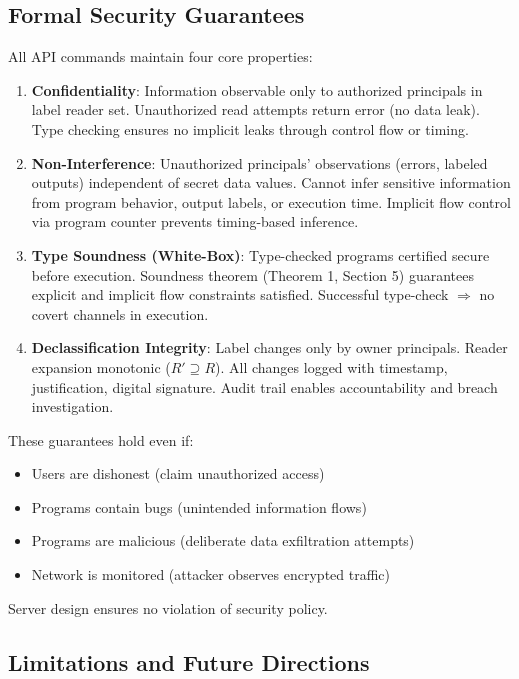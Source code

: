 \subsection{Formal Security Guarantees}

All API commands maintain four core properties:

\begin{enumerate}
\item \textbf{Confidentiality}: Information observable only to authorized principals in label reader set. Unauthorized read attempts return error (no data leak). Type checking ensures no implicit leaks through control flow or timing.

\item \textbf{Non-Interference}: Unauthorized principals' observations (errors, labeled outputs) independent of secret data values. Cannot infer sensitive information from program behavior, output labels, or execution time. Implicit flow control via program counter prevents timing-based inference.

\item \textbf{Type Soundness (White-Box)}: Type-checked programs certified secure before execution. Soundness theorem (Theorem 1, Section 5) guarantees explicit and implicit flow constraints satisfied. Successful type-check $\Rightarrow$ no covert channels in execution.

\item \textbf{Declassification Integrity}: Label changes only by owner principals. Reader expansion monotonic ($R' \supseteq R$). All changes logged with timestamp, justification, digital signature. Audit trail enables accountability and breach investigation.
\end{enumerate}

These guarantees hold even if:
\begin{itemize}
\item Users are dishonest (claim unauthorized access)
\item Programs contain bugs (unintended information flows)
\item Programs are malicious (deliberate data exfiltration attempts)
\item Network is monitored (attacker observes encrypted traffic)
\end{itemize}

Server design ensures no violation of security policy.

\subsection{Limitations and Future Directions}


